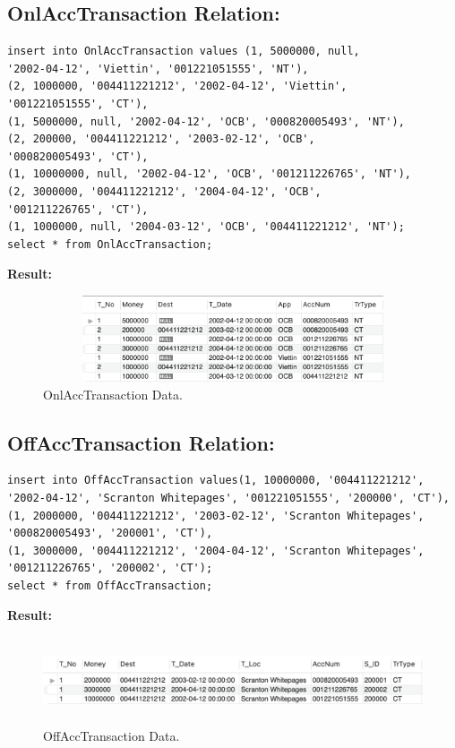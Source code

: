 \documentclass[12pt,a4paper]{article}
\begin{document}
\subsection{OnlAccTransaction Relation:}
\begin{verbatim}
insert into OnlAccTransaction values (1, 5000000, null, 
'2002-04-12', 'Viettin', '001221051555', 'NT'), 
(2, 1000000, '004411221212', '2002-04-12', 'Viettin', 
'001221051555', 'CT'), 
(1, 5000000, null, '2002-04-12', 'OCB', '000820005493', 'NT'), 
(2, 200000, '004411221212', '2003-02-12', 'OCB', 
'000820005493', 'CT'), 
(1, 10000000, null, '2002-04-12', 'OCB', '001211226765', 'NT'), 
(2, 3000000, '004411221212', '2004-04-12', 'OCB', 
'001211226765', 'CT'),
(1, 1000000, null, '2004-03-12', 'OCB', '004411221212', 'NT');
select * from OnlAccTransaction;
\end{verbatim}

\textbf{Result:}
\begin{figure}[H]
    \centering
    \includegraphics[width=5.5in,height=1in]{Picture/OnlAccTransactionData.png}
    \caption{OnlAccTransaction Data.}
\end{figure}

\subsection{OffAccTransaction Relation:}
\begin{verbatim}
insert into OffAccTransaction values(1, 10000000, '004411221212', 
'2002-04-12', 'Scranton Whitepages', '001221051555', '200000', 'CT'), 
(1, 2000000, '004411221212', '2003-02-12', 'Scranton Whitepages', 
'000820005493', '200001', 'CT'), 
(1, 3000000, '004411221212', '2004-04-12', 'Scranton Whitepages', 
'001211226765', '200002', 'CT');
select * from OffAccTransaction;
\end{verbatim}

\textbf{Result:}
\begin{figure}[H]
    \centering
    \includegraphics[width=5.5in,height=1in]{Picture/OffAccTransactionData.png}
    \caption{OffAccTransaction Data.}
\end{figure}
\end{document}
